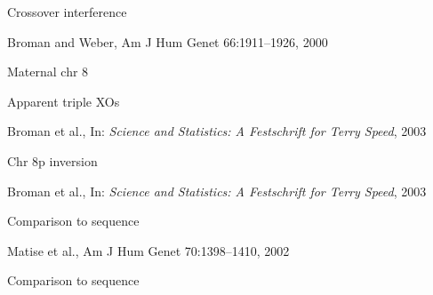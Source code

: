 \documentclass[aspectratio=169,12pt,t]{beamer}
\begin{document}
\begin{frame}{Crossover interference}


\vspace{3mm}

\hfill {\scriptsize \lolit Broman and Weber, Am J Hum Genet 66:1911--1926, 2000}

\end{frame}



\begin{frame}[c]{Maternal chr 8}
\end{frame}



\begin{frame}{Apparent triple XOs}


\vspace{2mm}

\hfill {\scriptsize \lolit Broman et al., In: \emph{Science and Statistics: A Festschrift for Terry Speed}, 2003}

\end{frame}


\begin{frame}{Chr 8p inversion}


\vspace{2mm}

\hfill {\scriptsize \lolit Broman et al., In: \emph{Science and Statistics: A Festschrift for Terry Speed}, 2003}


\end{frame}



\begin{frame}{Comparison to sequence}


\vspace{4mm}


\vspace{6mm}

\hfill {\scriptsize \lolit Matise et al., Am J Hum Genet 70:1398--1410, 2002}


\end{frame}


\begin{frame}{Comparison to sequence}

\vspace{5mm}


\end{frame}
\end{document}

